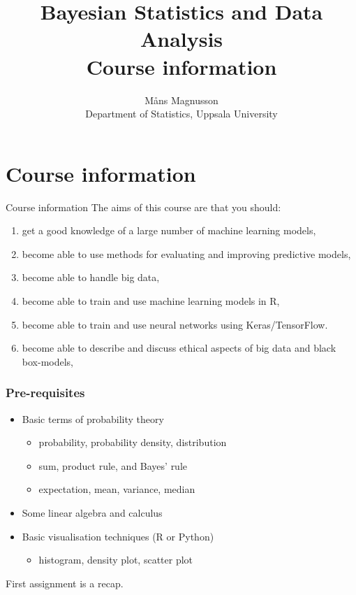 \documentclass[10pt,handout]{beamer}
\title[]{{\color{black}Bayesian Statistics and Data Analysis \\ Course information}}
\author[]{M{\aa}ns Magnusson \\ Department of Statistics, Uppsala University}
\date{}
\begin{document}
\frame{\titlepage
}



\section{Course information}
\frame{\sectionpage}

\begin{frame}{Course information}
The aims of this course are that you should:\\[3mm]\pause
\begin{enumerate}
\item get a good knowledge of a large number of machine learning models,
\item become able to use methods for evaluating and improving predictive models,
\item become able to handle big data,
\item become able to train and use machine learning models in R,
\item become able to train and use neural networks using Keras/TensorFlow.
\item become able to describe and discuss ethical aspects of big data and black box-models,
\end{enumerate}

\end{frame}


\begin{frame}
  \frametitle{Pre-requisites}
  \begin{itemize}
  \item Basic terms of probability theory
    \begin{itemize}
    \item probability, probability density, distribution
    \item sum, product rule, and Bayes' rule
    \item expectation, mean, variance, median
  \end{itemize}
  \item Some linear algebra and calculus
  \item Basic visualisation techniques (R or Python)
  \begin{itemize}
    \item histogram, density plot, scatter plot
  \end{itemize}
  \end{itemize}

  First assignment is a recap.

\end{frame}
\end{document}

